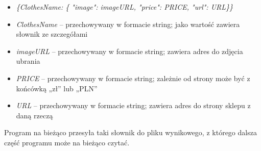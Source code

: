 \begin{itemize}
\item[] \emph{\{ClothesName: \{ "image": imageURL, "price": PRICE, "url": URL\}\}}
\item[] \emph{ClothesName} – przechowywany w formacie string; jako wartość zawiera słownik ze szczegółami
\item[] \emph{imageURL} – przechowywany w formacie string; zawiera adres do zdjęcia ubrania
\item[] \emph{PRICE} – przechowywany w formacie string; zależnie od strony może być z końcówką „zł” lub „PLN”
\item[] \emph{URL} – przechowywany w formacie string; zawiera adres do strony sklepu z daną rzeczą
\end{itemize}
Program na bieżąco przesyła taki słownik do pliku wynikowego, z którego dalsza część programu może na bieżąco czytać.


